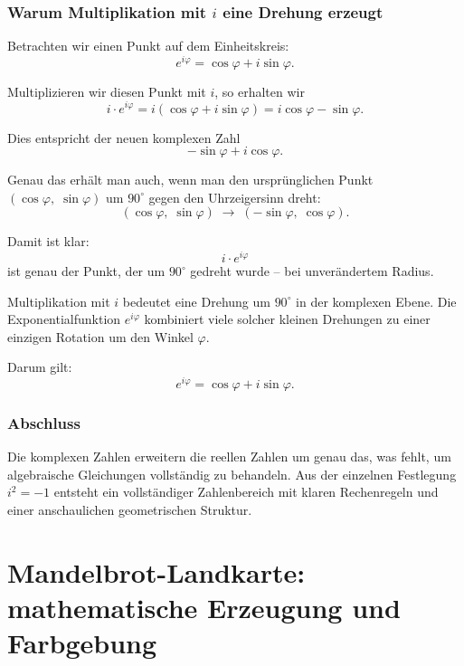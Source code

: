 \subsubsection*{Warum Multiplikation mit \boldmath$i$ eine Drehung erzeugt}

Betrachten wir einen Punkt auf dem Einheitskreis:
\[
e^{i\varphi} = \cos\varphi + i\sin\varphi.
\]

Multiplizieren wir diesen Punkt mit $i$, so erhalten wir
\[
i \cdot e^{i\varphi}
= i(\cos\varphi + i\sin\varphi)
= i\cos\varphi - \sin\varphi.
\]

Dies entspricht der neuen komplexen Zahl
\[
-\sin\varphi + i\cos\varphi.
\]

Genau das erhält man auch, wenn man den ursprünglichen Punkt
\((\cos\varphi,\;\sin\varphi)\)
um \(90^\circ\) gegen den Uhrzeigersinn dreht:
\[
(\cos\varphi,\;\sin\varphi)
\;\longrightarrow\;
(-\sin\varphi,\;\cos\varphi).
\]

Damit ist klar:
\[
i \cdot e^{i\varphi}
\]
ist genau der Punkt, der um \(90^\circ\) gedreht wurde -- bei unverändertem Radius.

\begin{DidacticBox}
	\label{box:euler-kernidee}
	Multiplikation mit $i$ bedeutet eine Drehung um $90^\circ$ in der komplexen Ebene.
	Die Exponentialfunktion $e^{i\varphi}$ kombiniert viele solcher kleinen Drehungen
	zu einer einzigen Rotation um den Winkel $\varphi$.
	
	Darum gilt:
	\[
	e^{i\varphi} = \cos\varphi + i\sin\varphi.
	\]
\end{DidacticBox}

\subsubsection*{Abschluss}

Die komplexen Zahlen erweitern die reellen Zahlen um genau das,
was fehlt, um algebraische Gleichungen vollständig zu behandeln.
Aus der einzelnen Festlegung $i^2=-1$ entsteht ein vollständiger Zahlenbereich
mit klaren Rechenregeln und einer anschaulichen geometrischen Struktur.

\section{Mandelbrot-Landkarte: mathematische Erzeugung und Farbgebung}
\label{app:mandelbrot-rendering}

